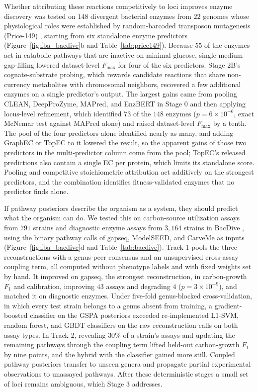 \documentclass[10pt,twocolumn]{article}
\begin{document}
Whether attributing these reactions competitively to loci improves enzyme discovery was tested on $148$ divergent bacterial enzymes from $22$ genomes whose physiological roles were established by random-barcoded transposon mutagenesis (Price-149) \citep{price2018mutant}, starting from six standalone enzyme predictors (Figure~\ref{fig:fba_bacdive}b and Table~\ref{tab:price149}). Because $55$ of the enzymes act in catabolic pathways that are inactive on minimal glucose, single-medium gap-filling lowered dataset-level $F_{\max}$ for four of the six predictors. Stage 2B's cognate-substrate probing, which rewards candidate reactions that share non-currency metabolites with chromosomal neighbors, recovered a few additional enzymes on a single predictor's output. The largest gains came from pooling CLEAN, DeepProZyme, MAPred, and EnzBERT in Stage 0 and then applying locus-level refinement, which identified $73$ of the $148$ enzymes ($p = 6 \times 10^{-6}$, exact McNemar test against MAPred alone) and raised dataset-level $F_{\max}$ by a tenth. The pool of the four predictors alone identified nearly as many, and adding GraphEC or TopEC to it lowered the result, so the apparent gains of those two predictors in the multi-predictor column come from the pool; TopEC's released predictions also contain a single EC per protein, which limits its standalone score. Pooling and competitive stoichiometric attribution act additively on the strongest predictors, and the combination identifies fitness-validated enzymes that no predictor finds alone.



If pathway posteriors describe the organism as a system, they should predict what the organism can do. We tested this on carbon-source utilization assays from $791$ strains and diagnostic enzyme assays from $3{,}164$ strains in BacDive \citep{reimer2022bacdive,schober2025bac}, using the binary pathway calls of gapseq, ModelSEED, and CarveMe as inputs (Figure~\ref{fig:fba_bacdive}d and Table~\ref{tab:bacdive}). Track 1 pools the three reconstructions with a genus-peer consensus and an unsupervised cross-assay coupling term, all computed without phenotype labels and with fixed weights set by hand. It improved on gapseq, the strongest reconstruction, in carbon-growth $F_1$ and calibration, improving $43$ assays and degrading $4$ ($p = 3 \times 10^{-9}$), and matched it on diagnostic enzymes. Under five-fold genus-blocked cross-validation, in which every test strain belongs to a genus absent from training, a gradient-boosted classifier on the GSPA posteriors exceeded re-implemented L1-SVM, random forest, and GBDT classifiers on the raw reconstruction calls on both assay types. In Track 2, revealing $30\%$ of a strain's assays and updating the remaining pathways through the coupling term lifted held-out carbon-growth $F_1$ by nine points, and the hybrid with the classifier gained more still. Coupled pathway posteriors transfer to unseen genera and propagate partial experimental observations to unassayed pathways. After these deterministic stages a small set of loci remains ambiguous, which Stage 3 addresses.
\end{document}
